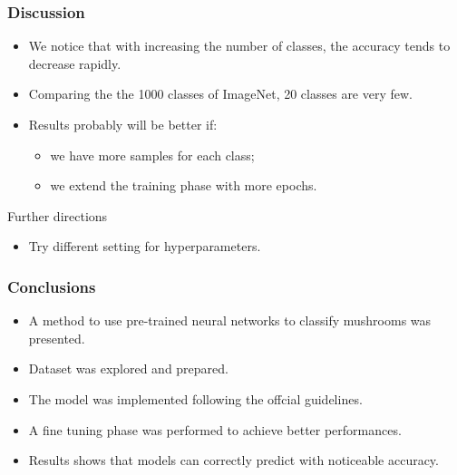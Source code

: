 \documentclass{beamer}
\begin{document}
\begin{frame}
\frametitle{Discussion}
\begin{itemize}
\setlength\itemsep{1em}
\item We notice that with increasing the number of classes,
the accuracy tends to decrease rapidly.
\item Comparing the the 1000 classes of ImageNet, 20 classes are very few.
\item Results probably will be better if:
\begin{itemize}
\item we have more samples for each class;
\item we extend the training phase with more epochs.
\end{itemize}
\end{itemize}
\begin{block}{Further directions}
\begin{itemize}
\item Try different setting for hyperparameters.
\end{itemize}
\end{block}
\end{frame}

\begin{frame}
\frametitle{Conclusions}
\begin{itemize}
\setlength\itemsep{1em}
\item A method to use pre-trained neural networks to classify mushrooms was presented. 
\item Dataset was explored and prepared.
\item The model was implemented following the offcial guidelines. \item A fine tuning phase was performed to achieve better performances. 
\item Results shows that models can correctly predict with noticeable accuracy.
\end{itemize}
\end{frame}
\end{document}
